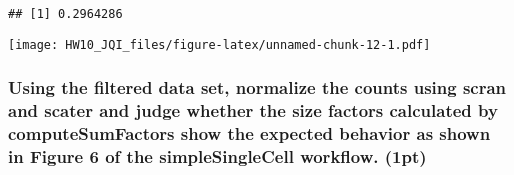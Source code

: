 \documentclass[]{article}
\newenvironment{Shaded}{\begin{snugshade}}{\end{snugshade}}
\newcommand{\KeywordTok}[1]{\textcolor[rgb]{0.13,0.29,0.53}{\textbf{#1}}}
\newcommand{\DataTypeTok}[1]{\textcolor[rgb]{0.13,0.29,0.53}{#1}}
\newcommand{\StringTok}[1]{\textcolor[rgb]{0.31,0.60,0.02}{#1}}
\newcommand{\OperatorTok}[1]{\textcolor[rgb]{0.81,0.36,0.00}{\textbf{#1}}}
\newcommand{\NormalTok}[1]{#1}
\begin{document}
\begin{verbatim}
## [1] 0.2964286
\end{verbatim}

\begin{Shaded}
\end{Shaded}

\texttt{[image: HW10\_JQI\_files/figure-latex/unnamed-chunk-12-1.pdf]}

\begin{Shaded}
\end{Shaded}

\subsubsection{Using the filtered data set, normalize the counts using
scran and scater and judge whether the size factors calculated by
computeSumFactors show the expected behavior as shown in Figure 6 of the
simpleSingleCell workflow.
(1pt)}\label{using-the-filtered-data-set-normalize-the-counts-using-scran-and-scater-and-judge-whether-the-size-factors-calculated-by-computesumfactors-show-the-expected-behavior-as-shown-in-figure-6-of-the-simplesinglecell-workflow.-1pt}
\end{document}
